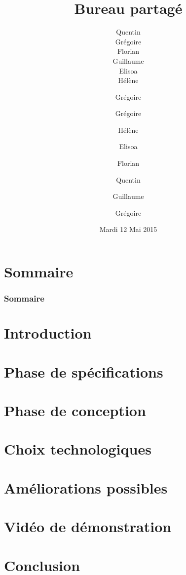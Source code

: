 \documentclass[11pt, handout]{beamer}
\title[Bureau partagé]{Bureau partagé}
\author{Quentin \bsc{Diaferia} \\ 
        Grégoire \bsc{Gutzwiller} \\ 
        Florian \bsc{Lepetit} \\ 
        Guillaume \bsc{Minette de Saint-Martin} \\ 
        Elisoa \bsc{Ramarokoto} \\ 
        Hélène \bsc{Soudry}}
\date[12/05/2015]{Mardi 12 Mai 2015}
\begin{document}
\begin{frame}[plain]
	\maketitle
\end{frame}


\section*{Sommaire}
\author{Grégoire }
\begin{frame}
	\frametitle{Sommaire}
	\tableofcontents
\end{frame}

\section{Introduction}
\author{Grégoire }


\section{Phase de spécifications}
\author{Hélène }


\section{Phase de conception}
\author{Elisoa }


\section{Choix technologiques}
\author{Florian }


\section{Améliorations possibles}
\author{Quentin }


\section{Vidéo de démonstration}
\author{Guillaume }


\section{Conclusion}
\author{Grégoire }

\end{document}
